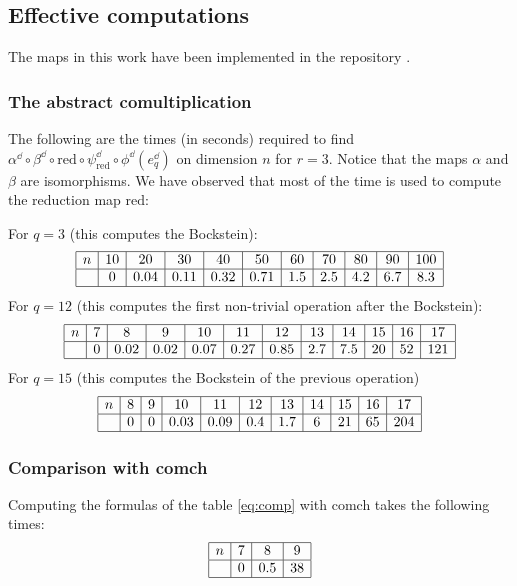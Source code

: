 \subsection{Effective computations} \label{s:python} The maps in this work have been implemented in the repository \cite{github-oddp}. 

\subsubsection{The abstract comultiplication} The following are the times (in seconds) required to find $\alpha^{\dd}\circ \beta^{\dd}\circ \mathrm{red}\circ \psi_{\mathrm{red}}^\dd\circ \phi^\dd(e_{q}^{\dd})$ on dimension $n$ for $r=3$. Notice that the maps $\alpha$ and $\beta$ are isomorphisms. We have observed that most of the time is used to compute the reduction map $\mathrm{red}$:

For $q=3$ (this computes the Bockstein):
\[
\begin{array}{|c|c|c|c|c|c|c|c|c|c|c|} \hline
	n & 10  & 20    & 30    & 40   & 50   & 60 & 70 & 80 & 90 & 100
	\\ \hline
	  &0    & 0.04  & 0.11  & 0.32 & 0.71 & 1.5 & 2.5& 4.2 & 6.7 & 8.3 \\ \hline
\end{array}
\]For $q=12$ (this computes the first non-trivial operation after the Bockstein):
\begin{equation}\label{eq:comp}
\begin{array}{|c|c|c|c|c|c|c|c|c|c|c|c|} \hline
	n & 7  & 8    & 9    & 10   & 11   & 12 & 13 & 14 & 15 & 16 & 17
	\\ \hline
	&0 &0.02& 0.02 & 0.07 & 0.27 & 0.85 & 2.7 & 7.5 & 20 & 52 & 121 \\ \hline
\end{array}
\end{equation}
For $q= 15$ (this computes the Bockstein of the previous operation)
\[
\begin{array}{|c|c|c|c|c|c|c|c|c|c|c|c|} \hline
	n & 8    & 9    & 10   & 11   & 12 & 13 & 14 & 15 & 16 & 17
	\\ \hline
	&0 & 0      & 0.03 & 0.09 & 0.4 & 1.7 & 6 & 21 & 65 & 204 \\ \hline
\end{array}
\]

\subsubsection{Comparison with comch} Computing the formulas of the table \eqref{eq:comp} with comch takes the following times:
\[
\begin{array}{|c|c|c|c|} \hline
	n & 7 & 8 & 9  \\ \hline
	&0  & 0.5 & 38 \\ \hline
\end{array}
\]

